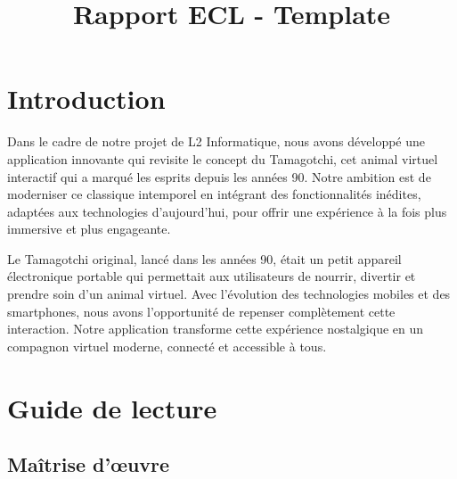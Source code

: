 \documentclass{rapportECL}
\title{Rapport ECL - Template} %
\begin{document}




        
\fairemarges %
\fairepagedegarde %
\renewcommand{\contentsname}{Sommaire}
\tableofcontents %
\newpage




\section{Introduction} 

Dans le cadre de notre projet de L2 Informatique, nous avons développé une application innovante qui revisite le concept du Tamagotchi, cet animal virtuel interactif qui a marqué les esprits depuis les années 90. Notre ambition est de moderniser ce classique intemporel en intégrant des fonctionnalités inédites, adaptées aux technologies d’aujourd’hui, pour offrir une expérience à la fois plus immersive et plus engageante.

Le Tamagotchi original, lancé dans les années 90, était un petit appareil électronique portable qui permettait aux utilisateurs de nourrir, divertir et prendre soin d’un animal virtuel. Avec l’évolution des technologies mobiles et des smartphones, nous avons l’opportunité de repenser complètement cette interaction. Notre application transforme cette expérience nostalgique en un compagnon virtuel moderne, connecté et accessible à tous.


\section{Guide de lecture}

\subsection{Maîtrise d’œuvre}
\end{document}
